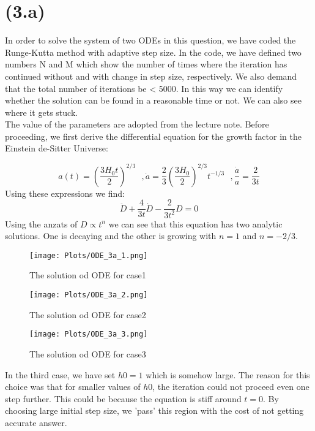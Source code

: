 \section{(3.a)}
In order to solve the system of two ODEs in this question, we have coded the Runge-Kutta method with adaptive step size. In the code, we have defined two numbers N and M which show the number of times where the iteration has continued without and with change in step size, respectively. We also demand that the total number of iterations be < 5000. In this way we can identify whether the solution can be found in a reasonable time or not. We can also see where it gets stuck.\\
The value of the parameters are adopted from the lecture note. Before proceeding, we first derive the differential equation for the growth factor in the Einstein de-Sitter Universe:

\begin{equation}
a(t) = (\frac{3H_{0}t}{2})^{2/3}\,\,\,\,,
\dot{a} = \frac{2}{3}(\frac{3H_{0}}{2})^{2/3} t^{-1/3}
\,\,\,\,, \frac{\dot{a}}{a}=\frac{2}{3t}
\end{equation}
Using these expressions we find:
\begin{equation}
\ddot{D}+\frac{4}{3t} \dot{D} -\frac{2}{3t^{2}} D=0
\end{equation}
Using the anzats of $D\propto t^n$ we can see that this equation has two analytic solutions. One is decaying and the other is growing with $n=1$ and $n=-2/3$.


\begin{figure}[!htb]
  \centering
  \texttt{[image: Plots/ODE\_3a\_1.png]}
  \caption{The solution od ODE for case1}
  \label{fig:fig5}
\end{figure}
\begin{figure}[!htb]
  \centering
  \texttt{[image: Plots/ODE\_3a\_2.png]}
  \caption{The solution od ODE for case2}
  \label{fig:fig6}
\end{figure}
\begin{figure}[!htb]
  \centering
  \texttt{[image: Plots/ODE\_3a\_3.png]}
  \caption{The solution od ODE for case3}
  \label{fig:fig7}
\end{figure}

\clearpage
In the third case, we have set $h0=1$ which is somehow large. The reason for this choice was that for smaller values of $h0$, the iteration could not proceed even one step further. This could be because the equation is stiff around $t=0$. By choosing large initial step size, we 'pass' this region with the cost of not getting accurate answer.
